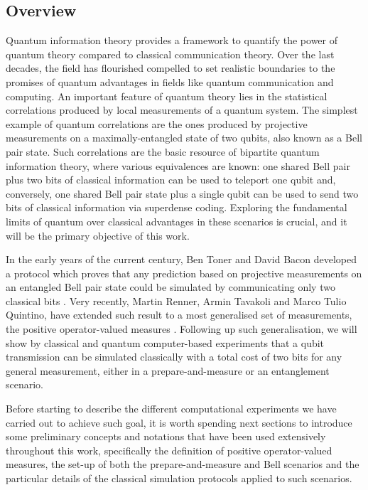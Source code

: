 \subsection{Overview}
Quantum information theory provides a framework to quantify the power of quantum theory compared to classical communication theory. Over the last decades, the field has flourished compelled to set realistic boundaries to the promises of quantum advantages in fields like quantum communication and computing. An important feature of quantum theory lies in the statistical correlations produced by local measurements of a quantum system. The simplest example of quantum correlations are the ones produced by projective measurements on a maximally-entangled state of two qubits, also known as a Bell pair state. Such correlations are the basic resource of bipartite quantum information theory, where various equivalences are known: one shared Bell pair plus two bits of classical information can be used to teleport one  qubit and, conversely, one shared Bell pair state plus a single qubit can be used to send two bits of classical information via superdense coding. Exploring the fundamental limits of quantum over classical advantages in these scenarios is crucial, and it will be the primary objective of this work.
\par
In the early years of the current century, Ben Toner and David Bacon developed a protocol which proves that any prediction based on projective measurements on an entangled Bell pair state could be simulated by communicating only two classical bits \cite{toner2003}. Very recently, Martin Renner, Armin Tavakoli and Marco Tulio Quintino, have extended such result to a most generalised set of measurements, the positive operator-valued measures \cite{renner2022}.
Following up such generalisation, we will show by classical and quantum computer-based experiments that a qubit transmission can be simulated classically with a total cost of two bits for any general measurement, either in a prepare-and-measure or an entanglement scenario. 
\par
Before starting to describe the different computational experiments we have carried out to achieve such goal, it is worth spending next sections to introduce some preliminary concepts and notations that have been used extensively throughout this work, specifically the definition of positive operator-valued measures, the set-up of both the prepare-and-measure and Bell scenarios and the particular details of the classical simulation protocols applied to such scenarios.
\par
